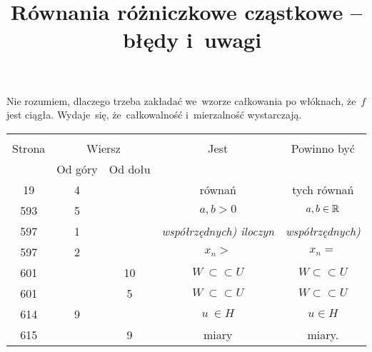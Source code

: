 \documentclass[a4paper,11pt]{article}
\title{Równania różniczkowe cząstkowe --~błędy i~uwagi}
\begin{document}



\maketitle  %





\start {}

\start {} Nie rozumiem, dlaczego trzeba zakładać we~wzorze
całkowania po włóknach, że~$f$ jest ciągła. Wydaje~się,
że~całkowalność i~mierzalność wystarczają.


\begin{center}
  \begin{tabular}{|c|c|c|c|c|}
    \hline
    & \multicolumn{2}{c|}{} & & \\
    Strona & \multicolumn{2}{c|}{Wiersz} & Jest
                              & Powinno być \\ \cline{2-3}
    & Od góry & Od dołu & & \\
    \hline
    19  &  4 & & równań & tych równań \\
    593 &  5 & & $a, b > 0$ & $a, b \in \mathbb{R}$ \\
    597 &  1 & & \emph{współrzędnych) iloczyn} & \emph{współrzędnych)} \\
    597 &  2 & & $x_{ n } >$ & $x_{ n } =$ \\
    601 & & 10 & $W \: \subset \subset U$ & $W \subset \subset U$ \\
    601 & &  5 & $W \: \subset \subset U$ & $W \subset \subset U$ \\
    614 &  9 & & $u \: \in H$ & $u \in H$\\
    615 & &  9 & miary & miary. \\
    \hline
  \end{tabular}
\end{center}
\end{document}
